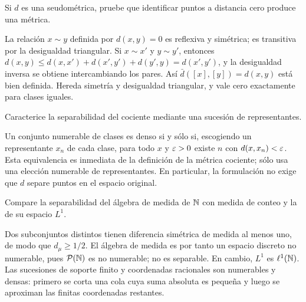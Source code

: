 \begin{ejercicio}\label{ej:v2-l16-2}
Si $d$ es una seudométrica, pruebe que identificar puntos a distancia cero produce una métrica.
\end{ejercicio}
\begin{solucion}
La relación $x\sim y$ definida por $d(x,y)=0$ es reflexiva y simétrica; es transitiva por la desigualdad triangular. Si $x\sim x'$ y $y\sim y'$, entonces $d(x,y)\le d(x,x')+d(x',y')+d(y',y)=d(x',y')$, y la desigualdad inversa se obtiene intercambiando los pares. Así $\bar d([x],[y])=d(x,y)$ está bien definida. Hereda simetría y desigualdad triangular, y vale cero exactamente para clases iguales.
\end{solucion}

\begin{ejercicio}\label{ej:v2-l16-3}
Caracterice la separabilidad del cociente mediante una sucesión de representantes.
\end{ejercicio}
\begin{solucion}
Un conjunto numerable de clases es denso si y sólo si, escogiendo un representante $x_n$ de cada clase, para todo $x$ y $\varepsilon>0$ existe $n$ con $d(x,x_n)<\varepsilon$. Esta equivalencia es inmediata de la definición de la métrica cociente; sólo usa una elección numerable de representantes. En particular, la formulación no exige que $d$ separe puntos en el espacio original.
\end{solucion}

\begin{ejercicio}\label{ej:v2-l16-4}
Compare la separabilidad del álgebra de medida de $\mathbb N$ con medida de conteo y la de su espacio $L^1$.
\end{ejercicio}
\begin{solucion}
Dos subconjuntos distintos tienen diferencia simétrica de medida al menos uno, de modo que $d_\mu\ge1/2$. El álgebra de medida es por tanto un espacio discreto no numerable, pues $\mathcal P(\mathbb N)$ es no numerable; no es separable. En cambio, $L^1$ es $\ell^1(\mathbb N)$. Las sucesiones de soporte finito y coordenadas racionales son numerables y densas: primero se corta una cola cuya suma absoluta es pequeña y luego se aproximan las finitas coordenadas restantes.
\end{solucion}

